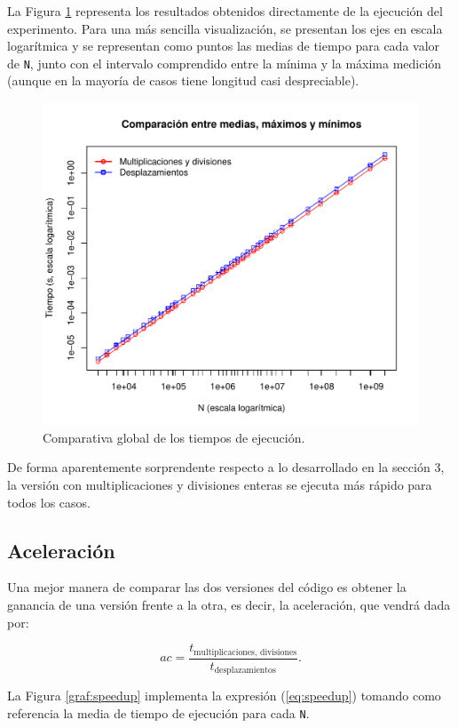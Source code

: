 \documentclass[11pt,a4paper,twoside]{article}
\theoremstyle{definition}
\begin{document}
	La Figura \ref{graf:tiempos} representa los resultados obtenidos directamente de la ejecución del experimento. Para una más sencilla visualización, se presentan los ejes en escala logarítmica y se representan como puntos las medias de tiempo para cada valor de \texttt{N}, junto con el intervalo comprendido entre la mínima y la máxima medición (aunque en la mayoría de casos tiene longitud casi despreciable).
	
	\begin{figure} [H] \centering
		\includegraphics[width=.8\textwidth]{../graficas/NOCHE_tiempos.pdf}
		\caption{Comparativa global de los tiempos de ejecución.}
		\label{graf:tiempos}
	\end{figure}

	De forma aparentemente sorprendente respecto a lo desarrollado en la sección 3, la versión con multiplicaciones y divisiones enteras se ejecuta más rápido para todos los casos.
	
	\subsection{Aceleración}
	
	Una mejor manera de comparar las dos versiones del código es obtener la ganancia de una versión frente a la otra, es decir, la aceleración, que vendrá dada por:
	
	\begin{equation} \label{eq:speedup}
		ac = \dfrac{t_{\text{multiplicaciones, divisiones}}}{t_{\text{desplazamientos}}}.
	\end{equation}

	La Figura \ref{graf:speedup} implementa la expresión (\ref{eq:speedup}) tomando como referencia la media de tiempo de ejecución para cada \texttt{N}.
	
\end{document}
